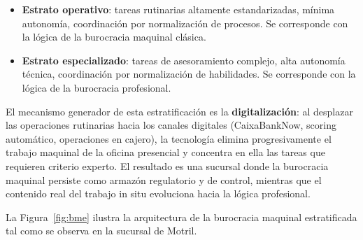 \begin{itemize}
  \item \textbf{Estrato operativo}: tareas rutinarias altamente estandarizadas, mínima
    autonomía, coordinación por normalización de procesos. Se corresponde con la lógica
    de la burocracia maquinal clásica.
  \item \textbf{Estrato especializado}: tareas de asesoramiento complejo, alta autonomía
    técnica, coordinación por normalización de habilidades. Se corresponde con la lógica
    de la burocracia profesional.
\end{itemize}

El mecanismo generador de esta estratificación es la \textbf{digitalización}: al
desplazar las operaciones rutinarias hacia los canales digitales (CaixaBankNow,
scoring automático, operaciones en cajero), la tecnología elimina progresivamente
el trabajo maquinal de la oficina presencial y concentra en ella las tareas que
requieren criterio experto. El resultado es una sucursal donde la burocracia maquinal
persiste como armazón regulatorio y de control, mientras que el contenido real del
trabajo in situ evoluciona hacia la lógica profesional.

La Figura~\ref{fig:bme} ilustra la arquitectura de la burocracia maquinal estratificada
tal como se observa en la sucursal de Motril.

